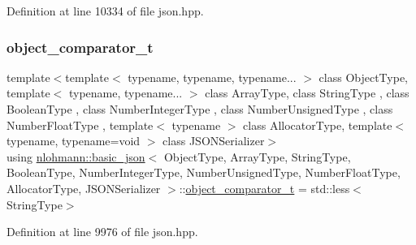 Definition at line 10334 of file json.\+hpp.

\mbox{\label{classnlohmann_1_1basic__json_abed9e77c5fcfc925fcdd489911069c3b}} 
\subsubsection{\texorpdfstring{object\+\_\+comparator\+\_\+t}{object\_comparator\_t}}
{\footnotesize\ttfamily template$<$template$<$ typename, typename, typename... $>$ class Object\+Type, template$<$ typename, typename... $>$ class Array\+Type, class String\+Type , class Boolean\+Type , class Number\+Integer\+Type , class Number\+Unsigned\+Type , class Number\+Float\+Type , template$<$ typename $>$ class Allocator\+Type, template$<$ typename, typename=void $>$ class J\+S\+O\+N\+Serializer$>$ \\
using \hyperlink{classnlohmann_1_1basic__json}{nlohmann\+::basic\+\_\+json}$<$ Object\+Type, Array\+Type, String\+Type, Boolean\+Type, Number\+Integer\+Type, Number\+Unsigned\+Type, Number\+Float\+Type, Allocator\+Type, J\+S\+O\+N\+Serializer $>$\+::\hyperlink{classnlohmann_1_1basic__json_abed9e77c5fcfc925fcdd489911069c3b}{object\+\_\+comparator\+\_\+t} =  std\+::less$<$String\+Type$>$}



Definition at line 9976 of file json.\+hpp.

\mbox{\label{classnlohmann_1_1basic__json_a5e48a7893520e1314bf0c9723e26ea2a}} 
